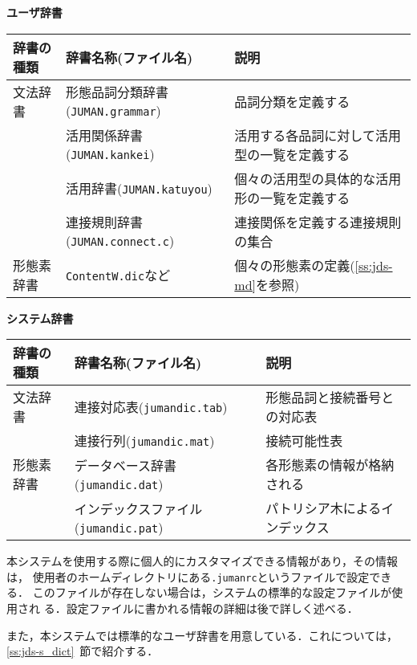 \documentclass[a4j,titlepage]{jarticle}
\begin{document}
\vspace{.5\baselineskip}
\noindent
{\bf ユーザ辞書}

\vspace{1mm}
\noindent
\begin{tabular}{|l|l|p{8cm}|}\hline
辞書の種類      & 辞書名称(ファイル名)  & 説明 \\ \hline\hline
文法辞書
  & 形態品詞分類辞書({\tt JUMAN.grammar}) & 品詞分類を定義する\\
  & 活用関係辞書({\tt JUMAN.kankei})
        & 活用する各品詞に対して活用型の一覧を定義する\\
  & 活用辞書({\tt JUMAN.katuyou})
        & 個々の活用型の具体的な活用形の一覧を定義する\\
  & 連接規則辞書({\tt JUMAN.connect.c})
        & 連接関係を定義する連接規則の集合\\ \hline
形態素辞書
  & {\tt ContentW.dic}など
        & 個々の形態素の定義(\ref{ss:jds-md}を参照)\\ \hline
\end{tabular}

\vspace{.5\baselineskip}
\noindent
{\bf システム辞書}

\vspace{1mm}
\noindent
\begin{tabular}{|l|l|p{55mm}|}\hline
辞書の種類      & 辞書名称(ファイル名)  & 説明 \\ \hline\hline
文法辞書        & 連接対応表({\tt jumandic.tab}) &
        形態品詞と接続番号との対応表\\
                & 連接行列({\tt jumandic.mat}) &
        接続可能性表 \\ \hline
形態素辞書      & データベース辞書({\tt jumandic.dat}) &
        各形態素の情報が格納される\\ 
        & インデックスファイル({\tt jumandic.pat}) &
        パトリシア木によるインデックス \\
        \hline
\end{tabular}
\vspace{.5\baselineskip}

本システムを使用する際に個人的にカスタマイズできる情報があり，その情報は，
使用者のホームディレクトリにある{\tt .jumanrc}というファイルで設定できる．
このファイルが存在しない場合は，システムの標準的な設定ファイルが使用され
る．設定ファイルに書かれる情報の詳細は後で詳しく述べる．

また，本システムでは標準的なユーザ辞書を用意している．これについては，
\ref{ss:jds-s_dict}~節で紹介する．
\end{document}
